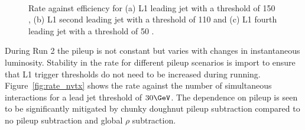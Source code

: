 \begin{figure}[h!]
  \centering
    ~
    \\
  \caption{\label{fig:rate_eff_jets} Rate against efficiency for (a) L1 leading jet with a threshold of 150 \GeV, 
  (b) L1 second leading jet with a threshold of 110 \GeV and (c) L1 fourth leading jet with a threshold of 50 \GeV.}
\end{figure}

During Run 2 the pileup is not constant but varies with changes in instantaneous luminosity. 
Stability in the rate for different pileup scenarios is import to ensure that L1 trigger thresholds 
do not need to be increased during running. Figure~\ref{fig:rate_nvtx} shows the rate against the number of 
simultaneous interactions for a lead jet threshold of $30 \GeV$. The dependence on pileup is 
seen to be significantly mitigated by chunky doughnut pileup subtraction compared to no pileup subtraction and global $\rho$
subtraction. 

